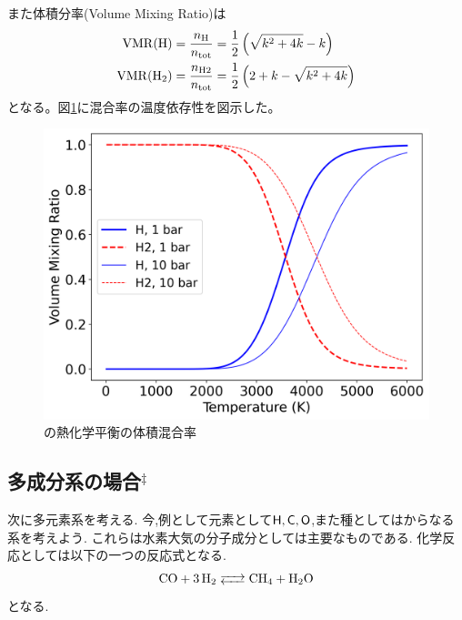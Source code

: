 また体積分率(Volume Mixing Ratio)は
\begin{align}
 \mathrm{VMR} (\ce{H}) &= \frac{n_\mathrm{H}}{n_\mathrm{tot}} = \frac{1}{2} \left( \sqrt{k^2 + 4 k} - k \right) \\
  \mathrm{VMR} (\ce{H2}) &= \frac{n_\mathrm{H2}}{n_\mathrm{tot}} = \frac{1}{2} \left( 2 + k - \sqrt{k^2 + 4 k}\right)
\end{align}
となる。図\ref{fig:temperature_exogibbs}に混合率の温度依存性を図示した。

\begin{figure}
    \centering
    \includegraphics[width=\linewidth]{fig/tce_two_species.png}
    \caption{の熱化学平衡の体積混合率}
    \label{fig:temperature_exogibbs}
\end{figure}

\subsection*{多成分系の場合$^\ddagger$}

次に多元素系を考える. 
今,例として元素として$\mathsf{H}, \mathsf{C}, \mathsf{O}$,また種としてはからなる系を考えよう. これらは水素大気の分子成分としては主要なものである. 化学反応としては以下の一つの反応式となる. 
\begin{align*}
\ce{CO + 3 H2 <--> CH4 + H2O}
\end{align*}
となる. 


